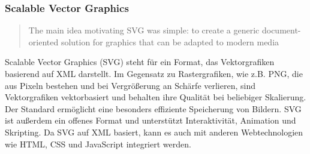     
    \subsubsection{Scalable Vector Graphics}
        \begin{quote}
            The main idea motivating \ac{SVG} was simple: to create a generic document-oriented solution  for graphics that can be adapted to modern media
            \grqq{}~
        \end{quote}
        Scalable Vector Graphics (SVG) steht für ein Format, das Vektorgrafiken basierend auf \ac{XML} darstellt.
        Im Gegensatz zu Rastergrafiken, wie z.B. PNG, die aus Pixeln bestehen und bei Vergrößerung an Schärfe verlieren, sind Vektorgrafiken vektorbasiert und behalten ihre Qualität bei beliebiger Skalierung. 
        Der Standard ermöglicht eine besonders effiziente Speicherung von Bildern.
        SVG ist außerdem ein offenes Format und unterstützt Interaktivität, Animation und Skripting. 
        Da SVG auf XML basiert, kann es auch mit anderen Webtechnologien wie HTML, \ac{CSS} und JavaScript integriert werden. 
        
